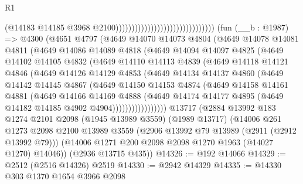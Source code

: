 \begin{lexlean}{R1}
\begin{coremodule}
                                                                (@14183
                                                                  @14185
                                                                  @3968
                                                                  @2100)))))))))))))))))))))))))))))))
    (fun (__b : @1987) =>
    @4300
      (@4651
        @4797
        (@4649
          @14070
          @14073
          @4804
          (@4649
            @14078
            @14081
            @4811
            (@4649
              @14086
              @14089
              @4818
              (@4649
                @14094
                @14097
                @4825
                (@4649
                  @14102
                  @14105
                  @4832
                  (@4649
                    @14110
                    @14113
                    @4839
                    (@4649
                      @14118
                      @14121
                      @4846
                      (@4649
                        @14126
                        @14129
                        @4853
                        (@4649
                          @14134
                          @14137
                          @4860
                          (@4649
                            @14142
                            @14145
                            @4867
                            (@4649
                              @14150
                              @14153
                              @4874
                              (@4649
                                @14158
                                @14161
                                @4881
                                (@4649
                                  @14166
                                  @14169
                                  @4888
                                  (@4649
                                    @14174
                                    @14177
                                    @4895
                                    (@4649 @14182 @14185 @4902 @4904)))))))))))))))))
    @13717
    (@2884
      @13992
      @183
      @1274
      @2101
      @2098
      (@1945 @13989 @3559)
      (@1989 @13717)
      (@14006
        @261
        @1273
        @2098
        @2100
        @13989
        @3559
        (@2906 @13992 @79 @13989 (@2911 (@2912 @13992 @79)))
        (@14006 @1271 @200 @2098 @2098 @1270 @1963 (@14027 @1270) @14046))
      (@2936 @13715 @435))
@14326 := @192 @14066
@14329 := @2512 (@2516 @14326) @2519
@14330 := @2942 @14329
@14335 := @14330 @303 @1370 @1654 @3966 @2098

\end{coremodule}
\end{lexlean}
